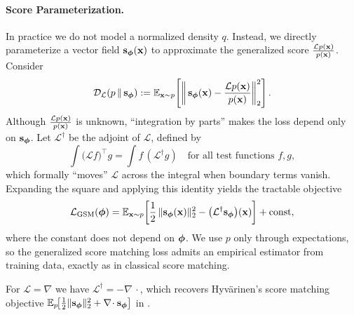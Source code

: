 \paragraph{Score Parameterization.}
In practice we do not model a normalized density $q$.
Instead, we directly parameterize a vector field ${\mathbf{s}}_{\bm{\phi}}({\mathbf{x}})$ to approximate the generalized score $\frac{\mathcal L p({\mathbf{x}})}{p({\mathbf{x}})}$.
Consider
\[
\mathcal D_{\mathcal L}\!\left(p \,\|\, {\mathbf{s}}_{\bm{\phi}}\right)
:= \mathbb E_{{\mathbf{x}}\sim p}\!\left[\left\|\,{\mathbf{s}}_{\bm{\phi}}({\mathbf{x}}) - \frac{\mathcal L p({\mathbf{x}})}{p({\mathbf{x}})}\right\|_2^2\right].
\]
Although $\frac{\mathcal L p({\mathbf{x}})}{p({\mathbf{x}})}$ is unknown, ``integration by parts'' makes the loss depend only on ${\mathbf{s}}_{\bm{\phi}}$.
Let $\mathcal L^\dagger$ be the adjoint of $\mathcal L$, defined by
\[
\int \big(\mathcal L f\big)^\top g
= \int f\,(\mathcal L^\dagger g)
\quad\text{for all test functions } f,g,
\]
which formally “moves” $\mathcal L$ across the integral when boundary terms vanish.
Expanding the square and applying this identity yields the tractable objective
\[
\mathcal L_{\text{GSM}}({\bm{\phi}})
= \mathbb E_{{\mathbf{x}}\sim p}\!\left[
\frac{1}{2}\,\|{\mathbf{s}}_{\bm{\phi}}({\mathbf{x}})\|_2^2
-
\big(\mathcal L^\dagger {\mathbf{s}}_{\bm{\phi}}\big)({\mathbf{x}})
\right] + \text{const},
\]
where the constant does not depend on ${\bm{\phi}}$. We use $p$ only through expectations, so the generalized score matching loss admits an empirical estimator from training data, exactly as in classical score matching.

For $\mathcal L=\nabla$ we have $\mathcal L^\dagger=-\nabla\!\,\cdot$, which recovers Hyv\"arinen’s score matching objective $\mathbb E_p\!\big[\tfrac{1}{2}\|{\mathbf{s}}_{\bm{\phi}}\|_2^2 + \nabla\!\cdot {\mathbf{s}}_{\bm{\phi}}\big]$ in .

